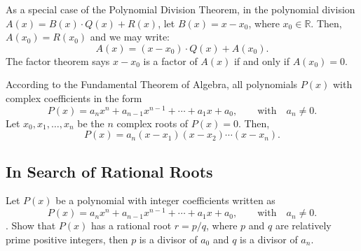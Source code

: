     
    \begin{theorem}
        As a special case of the Polynomial Division Theorem, in the polynomial division $A(x) = B(x) \cdot Q(x) + R(x)$, let $B(x)=x-x_0$, where $x_0 \in\mathbb R$. Then, $A(x_0)=R(x_0)$ and we may write:
        \[A(x)=(x-x_0)\cdot Q(x) + A(x_0).\]
        The factor theorem says $x-x_0$ is a factor of $A(x)$ if and only if $A(x_0)=0$.
    \end{theorem}
    
    \begin{theorem}
        According to the Fundamental Theorem of Algebra, all polynomials $P(x)$ with complex coefficients in the form
        \[P(x)=a_nx^n+a_{n-1}x^{n-1}+\cdots+a_1x+a_0, \qquad \text{with} \quad a_n\neq 0.\]
        Let $x_0,x_1,\dots,x_n$ be the $n$ complex roots of $P(x)=0$. Then, 
        \[P(x)=a_n(x-x_1)(x-x_2)\cdots(x-x_n).\]
    \end{theorem}
    


\subsection{In Search of Rational Roots}

\begin{tcolorbox}[title={Rational Root Theorem}]
    \begin{theorem}
        Let $P(x)$ be a polynomial with integer coefficients written as \[P(x)=a_nx^n+a_{n-1}x^{n-1}+\cdots+a_1x+a_0, \qquad \text{with} \quad a_n\neq 0.\]. Show that $P(x)$ has a rational root $r=p/q$, where $p$ and $q$ are relatively prime positive integers, then $p$ is a divisor of $a_0$ and $q$ is a divisor of $a_n$.
    \end{theorem}
\end{tcolorbox}


